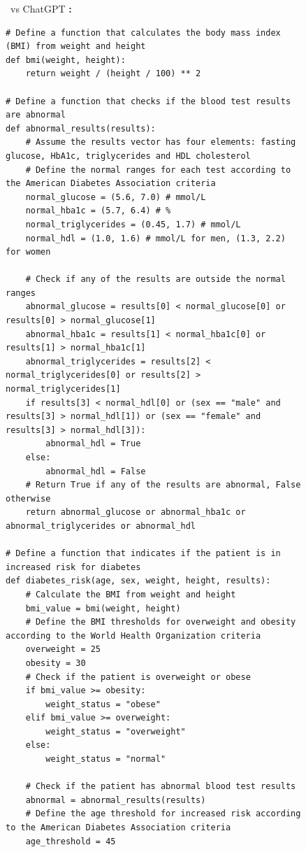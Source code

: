 \begin{figure}[H]
\begin{AIbox}{\DV\ vs ChatGPT}
{\bf \DV:}\begin{verbatim}
# Define a function that calculates the body mass index (BMI) from weight and height
def bmi(weight, height):
    return weight / (height / 100) ** 2

# Define a function that checks if the blood test results are abnormal
def abnormal_results(results):
    # Assume the results vector has four elements: fasting glucose, HbA1c, triglycerides and HDL cholesterol
    # Define the normal ranges for each test according to the American Diabetes Association criteria
    normal_glucose = (5.6, 7.0) # mmol/L
    normal_hba1c = (5.7, 6.4) # %
    normal_triglycerides = (0.45, 1.7) # mmol/L
    normal_hdl = (1.0, 1.6) # mmol/L for men, (1.3, 2.2) for women
    
    # Check if any of the results are outside the normal ranges
    abnormal_glucose = results[0] < normal_glucose[0] or results[0] > normal_glucose[1]
    abnormal_hba1c = results[1] < normal_hba1c[0] or results[1] > normal_hba1c[1]
    abnormal_triglycerides = results[2] < normal_triglycerides[0] or results[2] > normal_triglycerides[1]
    if results[3] < normal_hdl[0] or (sex == "male" and results[3] > normal_hdl[1]) or (sex == "female" and results[3] > normal_hdl[3]):
        abnormal_hdl = True
    else:
        abnormal_hdl = False
    # Return True if any of the results are abnormal, False otherwise
    return abnormal_glucose or abnormal_hba1c or abnormal_triglycerides or abnormal_hdl

# Define a function that indicates if the patient is in increased risk for diabetes
def diabetes_risk(age, sex, weight, height, results):
    # Calculate the BMI from weight and height
    bmi_value = bmi(weight, height)
    # Define the BMI thresholds for overweight and obesity according to the World Health Organization criteria
    overweight = 25
    obesity = 30
    # Check if the patient is overweight or obese
    if bmi_value >= obesity:
        weight_status = "obese"
    elif bmi_value >= overweight:
        weight_status = "overweight"
    else:
        weight_status = "normal"
    
    # Check if the patient has abnormal blood test results
    abnormal = abnormal_results(results)
    # Define the age threshold for increased risk according to the American Diabetes Association criteria
    age_threshold = 45
    

\end{verbatim}
\end{AIbox}
\end{figure}
